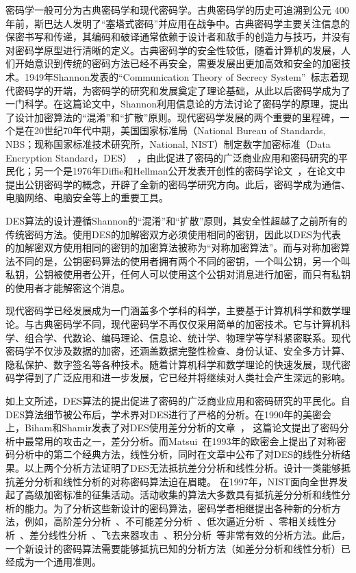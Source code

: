 \documentclass[a4paper,zihao=-4,AutoFakeBold]{ctexart}
\begin{document}
密码学一般可分为古典密码学和现代密码学。古典密码学的历史可追溯到公元 400 年前，斯巴达人发明了``塞塔式密码''并应用在战争中。古典密码学主要关注信息的保密书写和传递，其编码和破译通常依赖于设计者和敌手的创造力与技巧，并没有对密码学原型进行清晰的定义。古典密码学的安全性较低，随着计算机的发展，人们开始意识到传统的密码方法已经不再安全，需要发展出更加高效和安全的加密技术。1949年Shannon发表的``Communication Theory of Secrecy System''~\cite{Shannon49}标志着现代密码学的开端，为密码学的研究和发展奠定了理论基础，从此以后密码学成为了一门科学。在这篇论文中，Shannon利用信息论的方法讨论了密码学的原理，提出了设计加密算法的``混淆''和``扩散''原则。现代密码学发展的两个重要的里程碑，一个是在20世纪70年代中期，美国国家标准局（National Bureau of Standards, NBS；现称国家标准技术研究所，National, NIST）制定数字加密标准（Data Encryption Standard，DES）~\cite{DES}，由此促进了密码的广泛商业应用和密码研究的平民化；另一个是1976年Diffie和Hellman公开发表开创性的密码学论文~\cite{DiffieHellman}，在论文中提出公钥密码学的概念，开辟了全新的密码学研究方向。此后，密码学成为通信、电脑网络、电脑安全等上的重要工具。

DES算法的设计遵循Shannon的``混淆''和``扩散''原则，其安全性超越了之前所有的传统密码方法。使用DES的加解密双方必须使用相同的密钥，因此以DES为代表的加解密双方使用相同的密钥的加密算法被称为``对称加密算法''。而与对称加密算法不同的是，公钥密码算法的使用者拥有两个不同的密钥，一个叫公钥，另一个叫私钥，公钥被使用者公开，任何人可以使用这个公钥对消息进行加密，而只有私钥的使用者才能解密这个消息。

现代密码学已经发展成为一门涵盖多个学科的科学，主要基于计算机科学和数学理论。与古典密码学不同，现代密码学不再仅仅采用简单的加密技术。它与计算机科学、组合学、代数论、编码理论、信息论、统计学、物理学等学科紧密联系。现代密码学不仅涉及数据的加密，还涵盖数据完整性检查、身份认证、安全多方计算、隐私保护、数字签名等各种技术。随着计算机科学和数学理论的快速发展，现代密码学得到了广泛应用和进一步发展，它已经并将继续对人类社会产生深远的影响。

如上文所述，DES算法的提出促进了密码的广泛商业应用和密码研究的平民化。自DES算法细节被公布后，学术界对DES进行了严格的分析。在1990年的美密会上，Biham和Shamir发表了对DES使用差分分析的文章~\cite{BihamSCRYPTO90}， 这篇论文提出了密码分析中最常用的攻击之一，差分分析。而Matsui~\cite{M94}在1993年的欧密会上提出了对称密码分析中的第二个经典方法，线性分析，同时在文章中公布了对DES的线性分析结果。以上两个分析方法证明了DES无法抵抗差分分析和线性分析。设计一类能够抵抗差分分析和线性分析的对称密码算法迫在眉睫。
在1997年，NIST面向全世界发起了高级加密标准的征集活动。活动收集的算法大多数具有抵抗差分分析和线性分析的能力。为了分析这些新设计的密码算法，密码学者相继提出各种新的分析方法，例如，高阶差分分析~\cite{LRK95}、不可能差分分析~\cite{BihamBS99}、低次逼近分析~\cite{GJloworderapproximation,KR96}、零相关线性分析~\cite{SunLGRL16}、差分线性分析~\cite{DLCTLi2019}、飞去来器攻击~\cite{BoomerangAttack99}、积分分析~\cite{IntegralCryptanalysis02}等非常有效的分析方法。此后，一个新设计的密码算法需要能够抵抗已知的分析方法（如差分分析和线性分析）已经成为一个通用准则。
\end{document}
